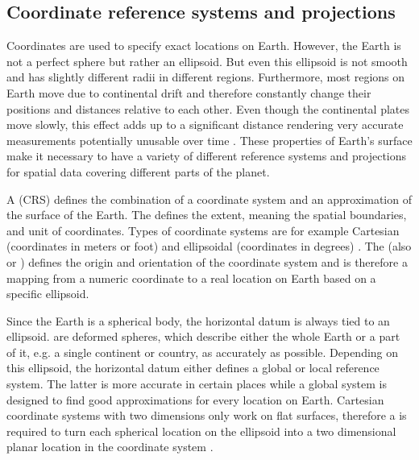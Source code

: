 	\subsection{Coordinate reference systems and projections}
	
		Coordinates are used to specify exact locations on Earth.
		However, the Earth is not a perfect sphere but rather an ellipsoid.
		But even this ellipsoid is not smooth and has slightly different radii in different regions.
		Furthermore, most regions on Earth move due to continental drift and therefore constantly change their positions and distances relative to each other.
		Even though the continental plates move slowly, this effect adds up to a significant distance rendering very accurate measurements potentially unusable over time \cite[7]{ordenance-survey-booklet}.
		These properties of Earth's surface make it necessary to have a variety of different reference systems and projections for spatial data covering different parts of the planet.
		
		A  (CRS) defines the combination of a coordinate system and an approximation of the surface of the Earth.
		The  defines the extent, meaning the spatial boundaries, and unit of coordinates.
		Types of coordinate systems are for example Cartesian (coordinates in meters or foot) and ellipsoidal (coordinates in degrees) \cite[11-13]{ordenance-survey-booklet}.
		The  (also  or ) defines the origin and orientation of the coordinate system and is therefore a mapping from a numeric coordinate to a real location on Earth based on a specific ellipsoid.
		
		Since the Earth is a spherical body, the horizontal datum is always tied to an ellipsoid.
		 are deformed spheres, which describe either the whole Earth or a part of it, e.g. a single continent or country, as accurately as possible.
		Depending on this ellipsoid, the horizontal datum either defines a global or local reference system.
		The latter is more accurate in certain places while a global system is designed to find good approximations for every location on Earth.
		Cartesian coordinate systems with two dimensions only work on flat surfaces, therefore a  is required to turn each spherical location on the ellipsoid into a two dimensional planar location in the coordinate system \cite[17]{ordenance-survey-booklet}.
		
